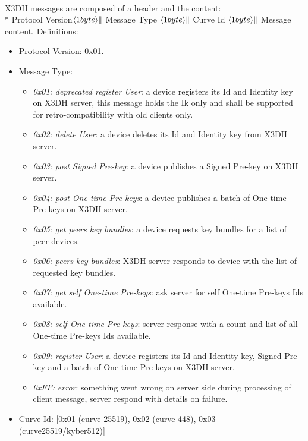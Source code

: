 \documentclass[a4paper,11pt]{article}
\begin{document}
    \paragraph*{}X3DH messages are composed of a header and the content:\\*
    Protocol Version$\langle 1byte\rangle \Arrowvert $ Message Type $\langle 1byte\rangle \Arrowvert $ Curve Id $\langle 1byte\rangle \Arrowvert $ Message content.
    Definitions:
      \begin{itemize}
      \item Protocol Version: 0x01.
      \item Message Type:
        \begin{itemize}
          \item \textit{0x01: deprecated register User}: a device registers its Id and Identity key on X3DH server, this message holds the Ik only and shall be supported for retro-compatibility with old clients only.
          \item \textit{0x02: delete User}: a device deletes its Id and Identity key from X3DH server.
          \item \textit{0x03: post Signed Pre-key}: a device publishes a Signed Pre-key on X3DH server.
          \item \textit{0x04: post One-time Pre-keys}: a device publishes a batch of One-time Pre-keys on X3DH server.
          \item \textit{0x05: get peers key bundles}: a device requests key bundles for a list of peer devices.
          \item \textit{0x06: peers key bundles}: X3DH server responds to device with the list of requested key bundles.
          \item \textit{0x07: get self One-time Pre-keys}: ask server for self One-time Pre-keys Ids available.
          \item \textit{0x08: self One-time Pre-keys}: server response with a count and list of all One-time Pre-keys Ids available.
          \item \textit{0x09: register User}: a device registers its Id and Identity key, Signed Pre-key and a batch of One-time Pre-keys on X3DH server.
          \item \textit{0xFF: error}: something went wrong on server side during processing of client message, server respond with details on failure.
        \end{itemize}
      \item Curve Id: [0x01 (curve 25519), 0x02 (curve 448), 0x03 (curve25519/kyber512)]
      \end{itemize}
\end{document}
